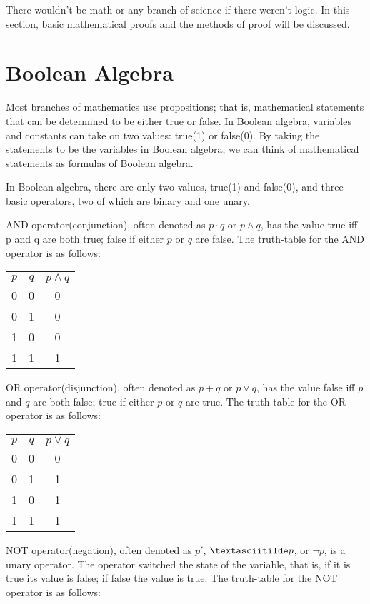 \documentclass{report}
\begin{document}
	There wouldn't be math or any branch of science if there weren't logic. In this section, basic mathematical proofs and the methods of proof will be discussed.
	\section{Boolean Algebra}
	Most branches of mathematics use propositions; that is, mathematical statements that can be determined to be either true or false. In Boolean algebra, variables and constants can take on two values: true(1) or false(0). By taking the statements to be the variables in Boolean algebra, we can think of mathematical statements as formulas of Boolean algebra.
	
	In Boolean algebra, there are only two values, true(1) and false(0), and three basic operators, two of which are binary and one unary.
	
	AND operator(conjunction), often denoted as $p \cdot q$ or $p \wedge q$, has the value true iff p and q are both true; false if either $p$ or $q$ are false. The truth-table for the AND operator is as follows:
	
	\begin{center}
	\begin{tabular}{ccc}
		$p$ & $q$ & $p \wedge q$ \\
		0 & 0 & 0\\
		0 & 1 & 0\\
		1 & 0 & 0\\
		1 & 1 & 1
	\end{tabular}
	\end{center}
	
	OR operator(disjunction), often denoted as $p + q$ or $p \vee q$, has the value false iff $p$ and $q$ are both false; true if either $p$ or $q$ are true. The truth-table for the OR operator is as follows:
	
	\begin{center}
	\begin{tabular}{ccc}
		$p$ & $q$ & $p \vee q$ \\
		0 & 0 & 0\\
		0 & 1 & 1\\
		1 & 0 & 1\\
		1 & 1 & 1
	\end{tabular}
	\end{center}
	
	NOT operator(negation), often denoted as $p'$, $\textasciitilde p$, or $\neg p$, is a unary operator. The operator switched the state of the variable, that is, if it is true its value is false; if false the value is true. The truth-table for the NOT operator is as follows:
	
\end{document}
